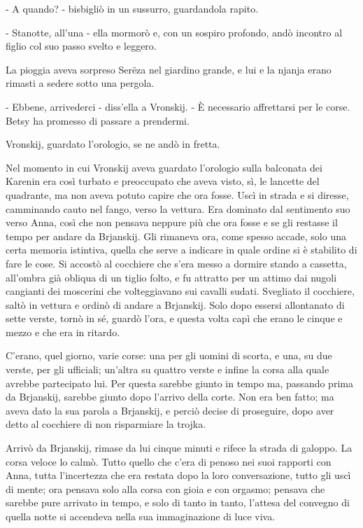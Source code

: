 - A quando? - bisbigliò in un sussurro, guardandola rapito. 

- Stanotte, all'una - ella mormorò e, con un sospiro profondo, andò incontro al figlio col suo passo svelto e leggero. 

La pioggia aveva sorpreso Serëza nel giardino grande, e lui e la njanja erano rimasti a sedere sotto una pergola. 

- Ebbene, arrivederci - diss'ella a Vronskij. - È necessario affrettarsi per le corse. Betsy ha promesso di passare a prendermi. 

Vronskij, guardato l'orologio, se ne andò in fretta. 
\enlargethispage*{1\baselineskip}

Nel momento in cui Vronskij aveva guardato l'orologio sulla balconata dei Karenin era così turbato e preoccupato che aveva visto, sì, le lancette del quadrante, ma non aveva potuto capire che ora fosse. Uscì in strada e si diresse, camminando cauto nel fango, verso la vettura. Era dominato dal sentimento suo verso Anna, così che non pensava neppure più che ora fosse e se gli restasse il tempo per andare da Brjanskij. Gli rimaneva ora, come spesso accade, solo una certa memoria istintiva, quella che serve a indicare in quale ordine si è stabilito di fare le cose. Si accostò al cocchiere che s'era messo a dormire stando a cassetta, all'ombra già obliqua di un tiglio folto, e fu attratto per un attimo dai nugoli cangianti dei moscerini che volteggiavano sui cavalli sudati. Svegliato il cocchiere, saltò in vettura e ordinò di andare a Brjanskij. Solo dopo essersi allontanato di sette verste, tornò in sé, guardò l'ora, e questa volta capì che erano le cinque e mezzo e che era in ritardo. 

C'erano, quel giorno, varie corse: una per gli uomini di scorta, e una, su due verste, per gli ufficiali; un'altra su quattro verste e infine la corsa alla quale avrebbe partecipato lui. Per questa sarebbe giunto in tempo ma, passando prima da Brjanskij, sarebbe giunto dopo l'arrivo della corte. Non era ben fatto; ma aveva dato la sua parola a Brjanskij, e perciò decise di proseguire, dopo aver detto al cocchiere di non risparmiare la trojka. 

Arrivò da Brjanskij, rimase da lui cinque minuti e rifece la strada di galoppo. La corsa veloce lo calmò. Tutto quello che c'era di penoso nei suoi rapporti con Anna, tutta l'incertezza che era restata dopo la loro conversazione, tutto gli uscì di mente; ora pensava solo alla corsa con gioia e con orgasmo; pensava che sarebbe pure arrivato in tempo, e solo di tanto in tanto, l'attesa del convegno di quella notte si accendeva nella sua immaginazione di luce viva. 

